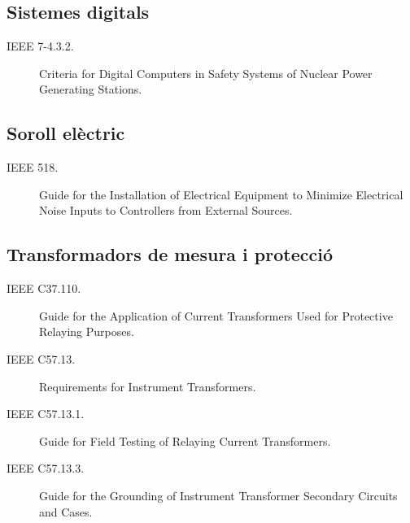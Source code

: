 \subsection*{Sistemes digitals}
\begin{description}
    \item [\hspace{5mm}IEEE 7-4.3.2.] Criteria for Digital Computers in Safety Systems of Nuclear Power Generating Stations.
\end{description}


\subsection*{Soroll elèctric}
\begin{description}
    \item [\hspace{5mm}IEEE 518.] Guide for the Installation of Electrical Equipment to Minimize Electrical Noise Inputs to Controllers from External Sources.
\end{description}


\subsection*{Transformadors de mesura i protecció}
\begin{description}
    \item [\hspace{5mm}IEEE C37.110.] Guide for the Application of Current Transformers Used for Protective Relaying Purposes.
    \item [\hspace{5mm}IEEE C57.13.] Requirements for Instrument Transformers.
    \item [\hspace{5mm}IEEE C57.13.1.] Guide for Field Testing of Relaying Current Transformers.
    \item [\hspace{5mm}IEEE C57.13.3.]  Guide for the Grounding of Instrument Transformer Secondary Circuits and Cases.
\end{description}


